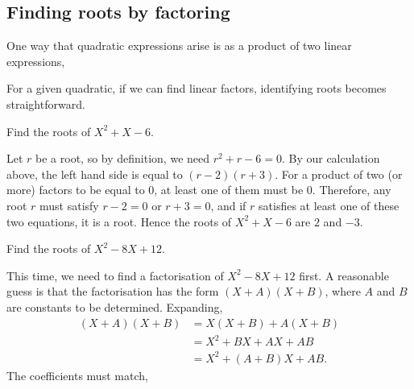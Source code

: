 \subsection{Finding roots by factoring}

One way that quadratic expressions arise is as a product of two linear expressions,

For a given quadratic, if we can find linear factors, identifying roots becomes straightforward.

\begin{example}
Find the roots of $X^2 + X - 6$. 
\end{example}
\begin{solution}
Let $r$ be a root, so by definition, we need $r^2 + r - 6 = 0$. By our calculation above, the left hand side is equal to $(r - 2)(r + 3)$. For a product of two (or more) factors to be equal to $0$, at least one of them must be $0$. Therefore, any root $r$ must satisfy $r - 2 = 0$ or $r + 3 = 0$, and if $r$ satisfies at least one of these two equations, it is a root. Hence the roots of $X^2 + X - 6$ are $2$ and $-3$.
\end{solution}

\begin{example}
Find the roots of $X^2 - 8X + 12$.
\end{example}
\begin{solution}
This time, we need to find a factorisation of $X^2 - 8X + 12$ first. A reasonable guess is that the factorisation has the form $(X + A)(X + B)$, where $A$ and $B$ are constants to be determined. Expanding,
\begin{align*}
(X + A)(X + B) &= X(X + B) + A(X + B) \\
&= X^2 + BX + AX + AB \\
&= X^2 + (A + B)X + AB.
\end{align*}
The coefficients must match, 
\end{solution}
